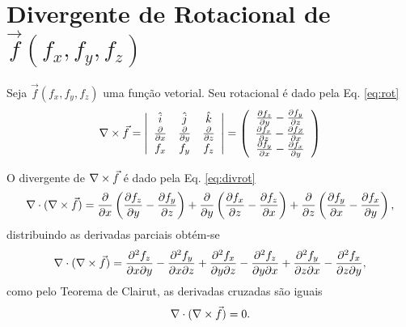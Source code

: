 \section{Divergente de Rotacional de $\vec{f}(f_x, f_y, f_z)$} \label{sec:ex2}
Seja $\vec{f}(f_x, f_y, f_z)$ uma fun\c{c}\~ao vetorial. Seu rotacional \'e dado pela Eq. \eqref{eq:rot}
\begin{equation}
    \label{eq:rot}
    \nabla \times \vec{f} = \left| \begin{array}{ccc}
        \hat{i} & \hat{j} & \hat{k} \\
        \frac{\partial}{\partial x} & \frac{\partial}{\partial y} & \frac{\partial}{\partial z} \\
        f_x & f_y & f_z
    \end{array} \right| = 
    \left(\begin{array}{ccc}
         \frac{\partial f_z}{\partial y} - \frac{\partial f_y}{\partial z} \\
        \frac{\partial f_x}{\partial z} - \frac{\partial f_Z}{\partial x} \\
         \frac{\partial f_y}{\partial x} - \frac{\partial f_x}{\partial y} 
    \end{array}
    \right)
\end{equation}

O divergente de $\nabla \times \vec{f}$ \'e dado pela Eq. \eqref{eq:divrot}
\begin{equation}
    \label{eq:divrot}
    \nabla \cdot (\nabla \times \vec{f}) = \frac{\partial}{\partial x} \left( \frac{\partial f_z}{\partial y} - \frac{\partial f_y}{\partial z} \right) + 
    \frac{\partial}{\partial y} \left( \frac{\partial f_x}{\partial z} - \frac{\partial f_z}{\partial x} \right) + 
    \frac{\partial}{\partial z} \left( \frac{\partial f_y}{\partial x} - \frac{\partial f_x}{\partial y} \right),
\end{equation}
distribuindo as derivadas parciais obt\'em-se
\begin{equation*}
    \nabla \cdot (\nabla \times \vec{f}) = 
    \frac{\partial^2 f_z}{\partial x\partial y} - \frac{\partial^2 f_y}{\partial x\partial z} + 
    \frac{\partial^2 f_x}{\partial y\partial z} - \frac{\partial^2 f_z}{\partial y\partial x}  + 
    \frac{\partial^2 f_y}{\partial z\partial x} - \frac{\partial^2 f_x}{\partial z \partial y},
\end{equation*}
como pelo Teorema de Clairut, as derivadas cruzadas s\~ao iguais
\begin{equation}
    \nabla \cdot (\nabla \times \vec{f}) = 0.
\end{equation}